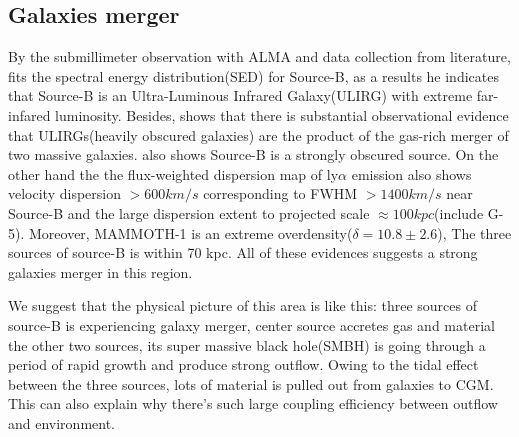 \subsection{Galaxies merger}

By the submillimeter observation with ALMA and data collection from literature, \cite{arrigoni2018qso} fits the spectral energy distribution(SED) for Source-B, as a results he indicates that Source-B is an Ultra-Luminous Infrared Galaxy(ULIRG) with extreme far-infared luminosity. Besides, \cite{treister2010major} shows that there is substantial observational evidence that ULIRGs(heavily obscured galaxies) are the product of the gas-rich merger of two massive galaxies. \cite{cai2017discovery} also shows Source-B is a strongly obscured source. On the other hand the the flux-weighted dispersion map of ly$\alpha$ emission also shows velocity dispersion $ >600 km/s$ corresponding to FWHM $>1400 km/s$ near Source-B and the large dispersion extent to projected scale $\approx 100 kpc$(include G-5). Moreover, MAMMOTH-1 is an extreme overdensity($\delta =10.8 \pm 2.6$), The three sources of source-B is within 70 kpc. All of these evidences suggests a strong galaxies merger in this region. 
	
	We suggest that the physical picture of this area is like this: three sources of source-B is experiencing galaxy merger, center source accretes gas and material the other two sources, its super massive black hole(SMBH) is going through a period of rapid growth and produce strong outflow. Owing to the tidal effect between the three sources, lots of material is pulled out from galaxies to CGM. This can also explain why there's such large coupling efficiency between outflow and environment. 
	
